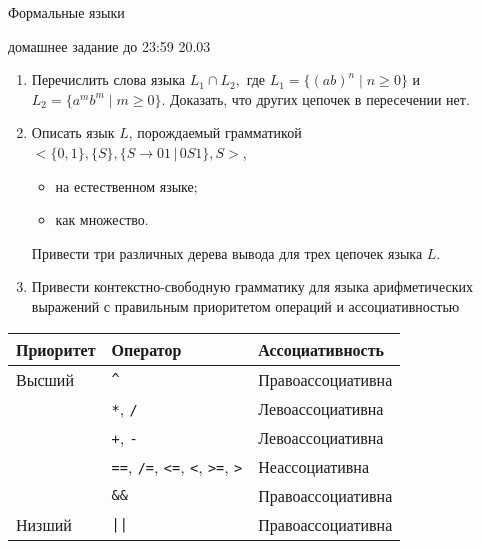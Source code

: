 \documentclass[12pt]{article}
\begin{document}
\begin{center}
\LARGE {Формальные языки}

\Large {домашнее задание до 23:59 20.03}
\end{center} 

\bigskip

\begin{enumerate}
  \item
  {
    Перечислить слова языка $L_1 \cap L_2,$ где $L_1 = \{ (ab)^n \mid n \geq 0 \}$ и $L_2 = \{ a^m b^m \mid m \geq 0 \}$. Доказать, что других цепочек в пересечении нет. 
  }
  \item 
  { Описать язык $L$, порождаемый грамматикой $<\{0, 1\}, \{S\}, \{S \to 0 1 \, | \, 0 S 1\}, S>$, 
    \begin{itemize}
        \item на естественном языке;
        \item как множество.
    \end{itemize}

  Привести три различных дерева вывода для трех цепочек языка $L$.
  }
  \item 
  {
  Привести контекстно-свободную грамматику для языка арифметических выражений с правильным приоритетом операций и ассоциативностью
  }
\end{enumerate}

\begin{table}[h]
\centering
\begin{tabular}{l|l|l}
Приоритет & Оператор & Ассоциативность \\ \hline
Высший & \verb!^! & Правоассоциативна \\
       & \verb!*!, \verb!/! & Левоассоциативна  \\
       & \verb!+!, \verb!-! & Левоассоциативна  \\
       & \verb!==!, \verb!/=!, \verb!<=!, \verb!<!, \verb!>=!, \verb!>! & Неассоциативна \\
       & \verb!&&! & Правоассоциативна \\
Низший & \verb!||! & Правоассоциативна 
\end{tabular}
\end{table}
\end{document}
